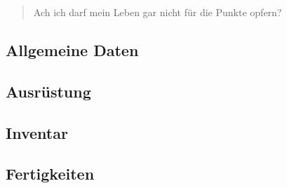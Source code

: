 \begin{quote}
    Ach ich darf mein Leben gar nicht für die Punkte opfern?
\end{quote}
\subsection{Allgemeine Daten}

\subsection{Ausrüstung}

\subsection{Inventar}

\subsection{Fertigkeiten}